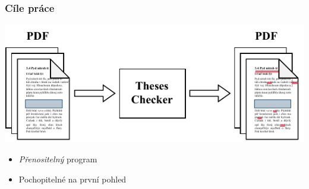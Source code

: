 
\begin{frame}
  \frametitle{Cíle práce}
  \includegraphics[width=\textwidth]{img/Theses_Checker_diagram.pdf}
  \begin{itemize}
    \item \emph{Přenositelný} program
    \item Pochopitelné na první pohled
  \end{itemize}
\end{frame}




